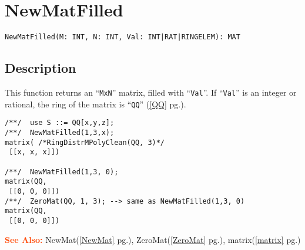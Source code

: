 \documentclass[a4paper]{mybook}
\newenvironment{command}{}{} %
\newcommand\SeeAlso{\par\textcolor{OrangeRed}{\textbf{\large See Also: }}}
\begin{document}
\section{NewMatFilled}
\label{NewMatFilled}
\begin{command} %


\begin{Verbatim}[label=syntax, rulecolor=\color{MidnightBlue},
frame=single]
NewMatFilled(M: INT, N: INT, Val: INT|RAT|RINGELEM): MAT
\end{Verbatim}


\subsection*{Description}

This function returns an ``\verb&MxN&'' matrix, filled with ``\verb&Val&''.  If ``\verb&Val&''
is an integer or rational, the ring of the matrix is ``\verb&QQ&'' (\ref{QQ} pg.\pageref{QQ}).
\begin{Verbatim}[label=example, rulecolor=\color{PineGreen}, frame=single]
/**/  use S ::= QQ[x,y,z];
/**/  NewMatFilled(1,3,x);
matrix( /*RingDistrMPolyClean(QQ, 3)*/
 [[x, x, x]])

/**/  NewMatFilled(1,3, 0);
matrix(QQ,
 [[0, 0, 0]])
/**/  ZeroMat(QQ, 1, 3); --> same as NewMatFilled(1,3, 0)
matrix(QQ,
 [[0, 0, 0]])
\end{Verbatim}


\SeeAlso %
  NewMat(\ref{NewMat} pg.\pageref{NewMat}), 
    ZeroMat(\ref{ZeroMat} pg.\pageref{ZeroMat}), 
    matrix(\ref{matrix} pg.\pageref{matrix})
\end{command} %
\end{document}
